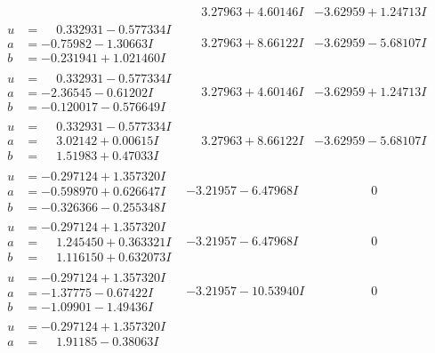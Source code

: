 \documentclass[1p]{elsarticle_modified}
\theoremstyle{definition}
\begin{document}
$$\begin{array}{c|c|c}
 & \phantom{-}3.27963 + 4.60146 I & -3.62959 + 1.24713 I \\ \hline\begin{aligned}
u &= \phantom{-}0.332931 - 0.577334 I \\
a &= -0.75982 - 1.30663 I \\
b &= -0.231941 + 1.021460 I\end{aligned}
 & \phantom{-}3.27963 + 8.66122 I & -3.62959 - 5.68107 I \\ \hline\begin{aligned}
u &= \phantom{-}0.332931 - 0.577334 I \\
a &= -2.36545 - 0.61202 I \\
b &= -0.120017 - 0.576649 I\end{aligned}
 & \phantom{-}3.27963 + 4.60146 I & -3.62959 + 1.24713 I \\ \hline\begin{aligned}
u &= \phantom{-}0.332931 - 0.577334 I \\
a &= \phantom{-}3.02142 + 0.00615 I \\
b &= \phantom{-}1.51983 + 0.47033 I\end{aligned}
 & \phantom{-}3.27963 + 8.66122 I & -3.62959 - 5.68107 I \\ \hline\begin{aligned}
u &= -0.297124 + 1.357320 I \\
a &= -0.598970 + 0.626647 I \\
b &= -0.326366 - 0.255348 I\end{aligned}
 & -3.21957 - 6.47968 I & \phantom{-0.000000 } 0 \\ \hline\begin{aligned}
u &= -0.297124 + 1.357320 I \\
a &= \phantom{-}1.245450 + 0.363321 I \\
b &= \phantom{-}1.116150 + 0.632073 I\end{aligned}
 & -3.21957 - 6.47968 I & \phantom{-0.000000 } 0 \\ \hline\begin{aligned}
u &= -0.297124 + 1.357320 I \\
a &= -1.37775 - 0.67422 I \\
b &= -1.09901 - 1.49436 I\end{aligned}
 & -3.21957 - 10.53940 I & \phantom{-0.000000 } 0 \\ \hline\begin{aligned}
u &= -0.297124 + 1.357320 I \\
a &= \phantom{-}1.91185 - 0.38063 I \\

\end{aligned}
\end{array}$$
\end{document}
